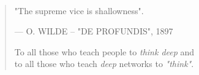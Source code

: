 \thispagestyle{empty}
\newpage
\thispagestyle{empty}

\newenvironment{dedication}
{\vspace{6ex}\begin{quotation}\begin{raggedleft}\begin{em}}
            {\par\end{em}\end{raggedleft}\end{quotation}}

\mbox{}\\[3cm]

\begin{dedication}
    \Large"The supreme vice is shallowness".\par\bigskip
    \normalsize{--- \MakeUppercase{O. Wilde -- "De Profundis"}, 1897}\par
    \mbox{}\newline
    \mbox{}\newline
    \large{To all those who teach people to \textit{think deep} and \\ to all those who teach \textit{deep} networks to \textit{"think"}.}\par
\end{dedication}

\newpage
\thispagestyle{empty}
\mbox{}
\newpage
\thispagestyle{empty}